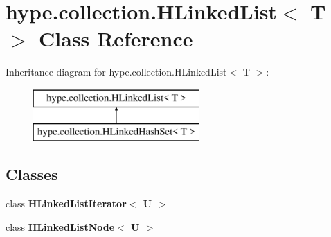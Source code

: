 \hypertarget{classhype_1_1collection_1_1_h_linked_list_3_01_t_01_4}{\section{hype.\-collection.\-H\-Linked\-List$<$ T $>$ Class Reference}
\label{classhype_1_1collection_1_1_h_linked_list_3_01_t_01_4}
}
Inheritance diagram for hype.\-collection.\-H\-Linked\-List$<$ T $>$\-:\begin{figure}[H]
\begin{center}
\leavevmode
\includegraphics[height=2.000000cm]{classhype_1_1collection_1_1_h_linked_list_3_01_t_01_4}
\end{center}
\end{figure}
\subsection*{Classes}
\begin{DoxyCompactItemize}
\item 
class {\bfseries H\-Linked\-List\-Iterator$<$ U $>$}
\item 
class {\bfseries H\-Linked\-List\-Node$<$ U $>$}
\end{DoxyCompactItemize}
